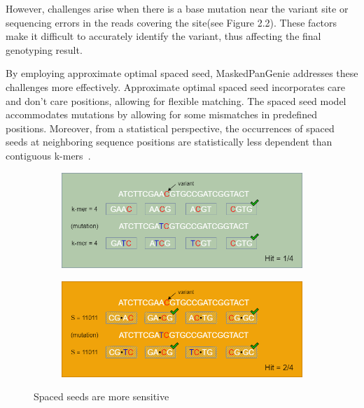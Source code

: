 \documentclass{PHlab-thesis}
\begin{document}
However, challenges arise when there is a base mutation near the variant site or sequencing errors in the reads covering the site(see Figure 2.2). These factors make it difficult to accurately identify the variant, thus affecting the final genotyping result.

By employing approximate optimal spaced seed, MaskedPanGenie addresses these challenges more effectively. Approximate optimal spaced seed incorporates care and don't care positions, allowing for flexible matching. The spaced seed model accommodates mutations by allowing for some mismatches in predefined positions. Moreover, from a statistical perspective, the occurrences of spaced seeds at neighboring sequence positions are statistically less dependent than contiguous k-mers~\cite{Girotto2018FSH}.\\
\begin{figure}
	\centering
    \begin{subfigure}[t]{0.48\textwidth}
        \centering
        \includegraphics[width=\textwidth]{figures/spaced_seed_mutation.drawio (5).png}
        \label{fig:MaskedPanGenie_fig1}
    \end{subfigure}
    \hfill
    \begin{subfigure}[t]{0.48\textwidth}
        \centering
        \includegraphics[width=\textwidth]{figures/spaced_seed_mutation.drawio (9).png}
        \label{fig:MaskedPanGenie_fig2}
    \end{subfigure}
    \caption{Spaced seeds are more sensitive}
\end{figure}
\end{document}
